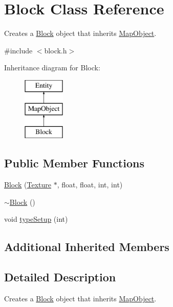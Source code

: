 \hypertarget{class_block}{\section{Block Class Reference}
\label{class_block}
}


Creates a \hyperlink{class_block}{Block} object that inherits \hyperlink{class_map_object}{Map\+Object}.  




{\ttfamily \#include $<$block.\+h$>$}

Inheritance diagram for Block\+:\begin{figure}[H]
\begin{center}
\leavevmode
\includegraphics[height=3.000000cm]{class_block}
\end{center}
\end{figure}
\subsection*{Public Member Functions}
\begin{DoxyCompactItemize}
\item 
\hyperlink{class_block_a3891a2f8968642512b5d2eeddc67131a}{Block} (\hyperlink{class_texture}{Texture} $\ast$, float, float, int, int)
\item 
\hyperlink{class_block_a19d1bd0e1cef6a865ed2745a2e648405}{$\sim$\+Block} ()
\item 
void \hyperlink{class_block_ae46fc2f3f732a601b6599bdc8250de3f}{type\+Setup} (int)
\end{DoxyCompactItemize}
\subsection*{Additional Inherited Members}


\subsection{Detailed Description}
Creates a \hyperlink{class_block}{Block} object that inherits \hyperlink{class_map_object}{Map\+Object}. 

